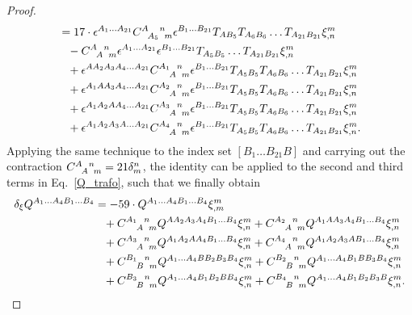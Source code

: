 \begin{proof}
\begin{equation}
\begin{aligned}
        &{} = 17 \cdot \epsilon^{A_1\dots A_{21}} \gmc{A}{A_5}{n}{m} \epsilon^{B_1\dots B_{21}} T_{AB_5}T_{A_6B_6}\dots T_{A_{21}B_{21}} \xi^m_{,n} \\
        &{} \hphantom{=} - \gmc{A}{A}{n}{m} \epsilon^{A_1\dots A_{21}}\epsilon^{B_1\dots B_{21}} T_{A_5B_5}\dots T_{A_{21}B_{21}} \xi^m_{,n} \\
        &{} \hphantom{=} + \epsilon^{AA_2A_3A_4\dots A_{21}} \gmc{A_1}{A}{n}{m} \epsilon^{B_1\dots B_{21}} T_{A_5B_5}T_{A_6B_6}\dots T_{A_{21}B_{21}} \xi^m_{,n} \\
        &{} \hphantom{=} + \epsilon^{A_1AA_3A_4\dots A_{21}} \gmc{A_2}{A}{n}{m} \epsilon^{B_1\dots B_{21}} T_{A_5B_5}T_{A_6B_6}\dots T_{A_{21}B_{21}} \xi^m_{,n} \\
        &{} \hphantom{=} + \epsilon^{A_1A_2AA_4\dots A_{21}} \gmc{A_3}{A}{n}{m} \epsilon^{B_1\dots B_{21}} T_{A_5B_5}T_{A_6B_6}\dots T_{A_{21}B_{21}} \xi^m_{,n} \\
        &{} \hphantom{=} + \epsilon^{A_1A_2A_3A\dots A_{21}} \gmc{A_4}{A}{n}{m} \epsilon^{B_1\dots B_{21}} T_{A_5B_5}T_{A_6B_6}\dots T_{A_{21}B_{21}} \xi^m_{,n}. \\
    \end{aligned}
  \end{equation}
  Applying the same technique to the index set $[B_1\dots B_{21} B]$ and carrying out the contraction $\gmc{A}{A}{n}{m} = 21\delta^{n}_{m}$, the identity can be applied to the second and third terms in Eq.~\eqref{Q_trafo}, such that we finally obtain
  \begin{equation}
    \begin{aligned}
      \delta_\xi Q^{A_1\dots A_4B_1\dots B_4} &{} = -59 \cdot Q^{A_1\dots A_4B_1\dots B_4} \xi^m_{,m} \\
                                                  &{} \hphantom{=} + \gmc{A_1}{A}{n}{m} Q^{AA_2A_3A_4B_1\dots B_4} \xi^m_{,n} + \gmc{A_2}{A}{n}{m} Q^{A_1AA_3A_4B_1\dots B_4} \xi^m_{,n} \\
                                                  &{} \hphantom{=} + \gmc{A_3}{A}{n}{m} Q^{A_1A_2AA_4B_1\dots B_4} \xi^m_{,n} + \gmc{A_4}{A}{n}{m} Q^{A_1A_2A_3AB_1\dots B_4} \xi^m_{,n} \\
                                                  &{} \hphantom{=} + \gmc{B_1}{B}{n}{m} Q^{A_1\dots A_4BB_2B_3B_4} \xi^m_{,n} + \gmc{B_2}{B}{n}{m} Q^{A_1\dots A_4B_1BB_3B_4} \xi^m_{,n} \\
                                                  &{} \hphantom{=} + \gmc{B_3}{B}{n}{m} Q^{A_1\dots A_4B_1B_2BB_4} \xi^m_{,n} + \gmc{B_4}{B}{n}{m} Q^{A_1\dots A_4B_1B_2B_3B} \xi^m_{,n}.

\end{aligned}
\end{equation}
\end{proof}
